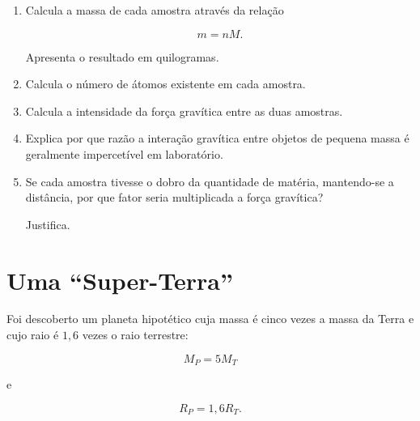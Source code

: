 \documentclass[11pt,a4paper]{article}
\newcommand{\resposta}[1][1]{
	\vspace{#1cm}
}
\begin{document}
	\begin{enumerate}[label=\textbf{\arabic*.},resume]
		
		\item Calcula a massa de cada amostra através da relação
		
		\[
		m=nM.
		\]
		
		Apresenta o resultado em quilogramas.
		
		\resposta[1.0]
		
		\item Calcula o número de átomos existente em cada amostra.
		
		\resposta[0.9]
		
		\item Calcula a intensidade da força gravítica entre as duas amostras.
		
		\resposta[1.3]
		
		\item Explica por que razão a interação gravítica entre objetos de pequena
		massa é geralmente impercetível em laboratório.
		
		\resposta[1.0]
		
		\item Se cada amostra tivesse o dobro da quantidade de matéria, mantendo-se
		a distância, por que fator seria multiplicada a força gravítica?
		
		Justifica.
		
		\resposta[0.9]
		
	\end{enumerate}
	
	\section{Uma ``Super-Terra''}
	
	Foi descoberto um planeta hipotético cuja massa é cinco vezes a massa
	da Terra e cujo raio é $1,6$ vezes o raio terrestre:
	
	\[
	M_P=5M_T
	\]
	
	e
	
	\[
	R_P=1{,}6R_T.
	\]
	
\end{document}
